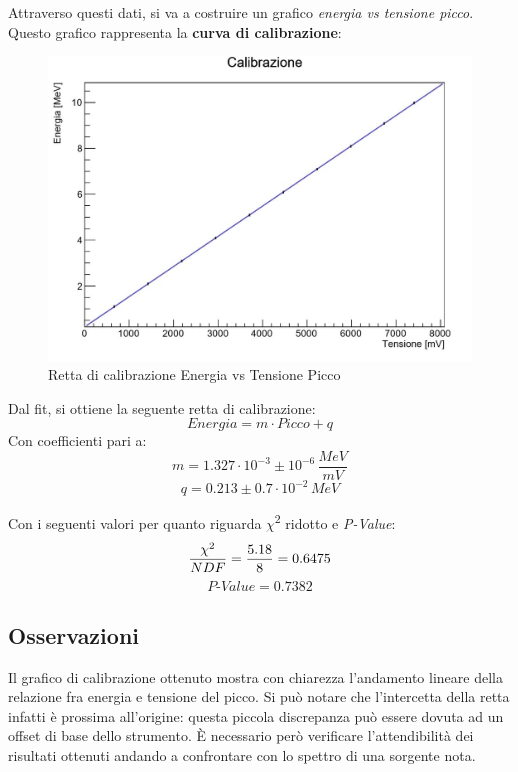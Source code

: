 \documentclass[a4paper,10pt]{article}
\begin{document}
\noindent Attraverso questi dati, si va a costruire un grafico \textit{energia vs tensione picco}. Questo grafico rappresenta la \textbf{curva di calibrazione}:

\begin{figure}[h!]
    \centering
    \includegraphics[scale=0.7]{rettacalibrazione.jpg}
    \caption{Retta di calibrazione Energia vs Tensione Picco}
\end{figure}

\noindent Dal fit, si ottiene la seguente retta di calibrazione:
$$
    Energia = m \cdot Picco + q
$$
Con coefficienti pari a:
$$
    m = 1.327\cdot10^{-3} \pm 10^{-6}\, \frac{MeV}{mV}
$$
$$
    q = 0.213 \pm 0.7\cdot10^{-2}\, MeV
$$

\noindent Con i seguenti valori per quanto riguarda $\chi$\textsuperscript{2} ridotto e \textit{P-Value}:
$$
    \frac{\chi\textsuperscript{2}}{NDF} = \frac{5.18}{8} = 0.6475
$$
$$
    \textit{P-Value} = 0.7382
$$

\subsection{Osservazioni}
Il grafico di calibrazione ottenuto mostra con chiarezza l'andamento lineare della relazione fra energia e tensione del picco. Si pu\`o notare che l'intercetta della retta infatti \`e prossima all'origine: questa piccola discrepanza pu\`o essere dovuta ad un offset di base dello strumento. 
\`E necessario per\`o verificare l'attendibilit\`a dei risultati ottenuti andando a confrontare con lo spettro di una sorgente nota.

\end{document}
